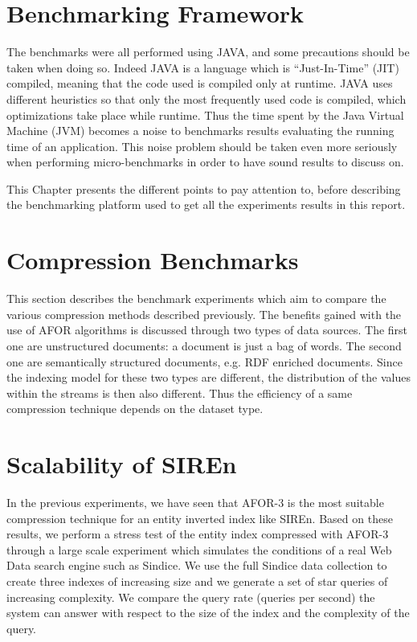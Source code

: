 \chapter{Benchmarking Framework}{
The benchmarks were all performed using JAVA, and some precautions should be
taken when doing so. Indeed JAVA is a language which is ``Just-In-Time'' (JIT)
compiled, meaning that the code used is compiled only at runtime. JAVA uses
different heuristics so that only the most frequently used code is compiled,
which optimizations take place while runtime. Thus the time spent by the Java
Virtual Machine (JVM) becomes a noise to benchmarks results evaluating the
running time of an application. This noise problem should be taken even more
seriously when performing micro-benchmarks in order to have sound results to
discuss on.

This Chapter presents the different points to pay attention to, before
describing the benchmarking platform used to get all the experiments results
in this report.
}
\label{chap:benchmarking-framework}


\chapter{Compression Benchmarks}{
This section describes the benchmark experiments which aim to compare the
various compression methods described previously. The benefits gained with the
use of AFOR algorithms is discussed through two types of data sources. The
first one are unstructured documents: a document is just a bag of words. The
second one are semantically structured documents, e.g. RDF enriched documents.
Since the indexing model for these two types are different, the distribution of
the values within the streams is then also different. Thus the efficiency of a
same compression technique depends on the dataset type.
}
\label{chap:benchmark-cmp}


\chapter{Scalability of SIREn}{
In the previous experiments, we have seen that AFOR-3 is the most suitable
compression technique for an entity inverted index like SIREn. Based on these
results, we perform a stress test of the entity index compressed with AFOR-3
through a large scale experiment which simulates the conditions of a real Web
Data search engine such as Sindice. We use the full Sindice data collection to
create three indexes of increasing size and we generate a set of star queries
of increasing complexity. We compare the query rate (queries per second)
the system can answer with respect to the size of the index and the complexity
of the query.
}
\label{chap:scalability}


